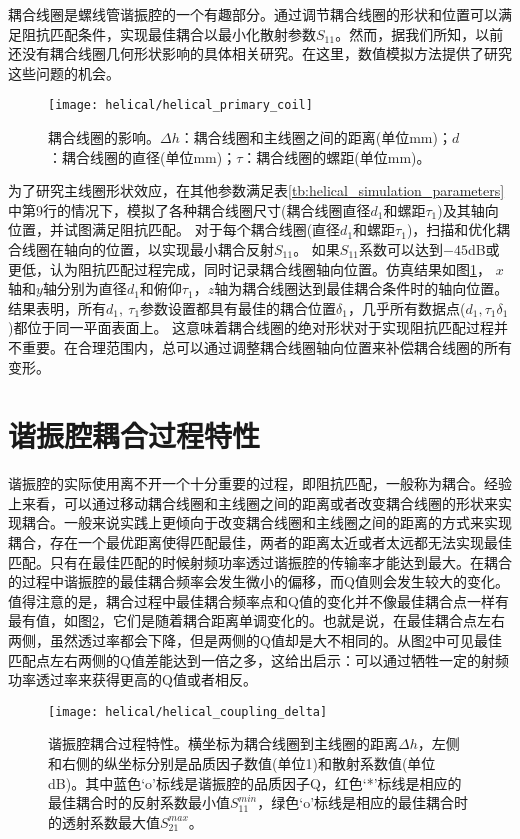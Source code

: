 耦合线圈是螺线管谐振腔的一个有趣部分。通过调节耦合线圈的形状和位置可以满足阻抗匹配条件，实现最佳耦合以最小化散射参数$S_{11}$。然而，据我们所知，以前还没有耦合线圈几何形状影响的具体相关研究。在这里，数值模拟方法提供了研究这些问题的机会。

\begin{figure}
    \centering
    \texttt{[image: helical/helical\_primary\_coil]}
    \caption[耦合线圈的影响]{耦合线圈的影响。$\Delta h$：耦合线圈和主线圈之间的距离(单位mm)；$d$：耦合线圈的直径(单位mm)；$\tau$：耦合线圈的螺距(单位mm)。\label{fig:helical_primary_coil}}
\end{figure}

为了研究主线圈形状效应，在其他参数满足表\ref{tb:helical_simulation_parameters}中第9行的情况下，模拟了各种耦合线圈尺寸(耦合线圈直径$d_1$和螺距$\tau_1$)及其轴向位置，并试图满足阻抗匹配。
对于每个耦合线圈(直径$d_1$和螺距$\tau_1$)，扫描和优化耦合线圈在轴向的位置，以实现最小耦合反射$S_{11}$。
如果$S_{11}$系数可以达到$-45$dB或更低，认为阻抗匹配过程完成，同时记录耦合线圈轴向位置。仿真结果如图\ref{fig:helical_primary_coil}，
$x$轴和$y$轴分别为直径$d_1$和俯仰$\tau_1$，$z$轴为耦合线圈达到最佳耦合条件时的轴向位置。
结果表明，所有$ d_1,\ \tau_1 $参数设置都具有最佳的耦合位置$ \delta_1$，几乎所有数据点($d_1,\tau_1\delta_1$)都位于同一平面表面上。
这意味着耦合线圈的绝对形状对于实现阻抗匹配过程并不重要。在合理范围内，总可以通过调整耦合线圈轴向位置来补偿耦合线圈的所有变形。

\section{谐振腔耦合过程特性}
谐振腔的实际使用离不开一个十分重要的过程，即阻抗匹配，一般称为耦合。经验上来看，可以通过移动耦合线圈和主线圈之间的距离或者改变耦合线圈的形状来实现耦合。一般来说实践上更倾向于改变耦合线圈和主线圈之间的距离的方式来实现耦合，存在一个最优距离使得匹配最佳，两者的距离太近或者太远都无法实现最佳匹配。只有在最佳匹配的时候射频功率透过谐振腔的传输率才能达到最大。在耦合的过程中谐振腔的最佳耦合频率会发生微小的偏移，而Q值则会发生较大的变化。值得注意的是，耦合过程中最佳耦合频率点和Q值的变化并不像最佳耦合点一样有最有值，如图\ref{fig:helical_coupling_delta}，它们是随着耦合距离单调变化的。也就是说，在最佳耦合点左右两侧，虽然透过率都会下降，但是两侧的Q值却是大不相同的。从图\ref{fig:helical_coupling_delta}中可见最佳匹配点左右两侧的Q值差能达到一倍之多，这给出启示：可以通过牺牲一定的射频功率透过率来获得更高的Q值或者相反。
\begin{figure}
    \centering
    \texttt{[image: helical/helical\_coupling\_delta]}
    \caption[谐振腔耦合过程特性]{谐振腔耦合过程特性。横坐标为耦合线圈到主线圈的距离$\Delta h$，左侧和右侧的纵坐标分别是品质因子数值(单位1)和散射系数值(单位dB)。其中蓝色‘o’标线是谐振腔的品质因子Q，红色‘*’标线是相应的最佳耦合时的反射系数最小值$S_{11}^{min}$，绿色‘o’标线是相应的最佳耦合时的透射系数最大值$S_{21}^{max}$。\label{fig:helical_coupling_delta}}
\end{figure}

